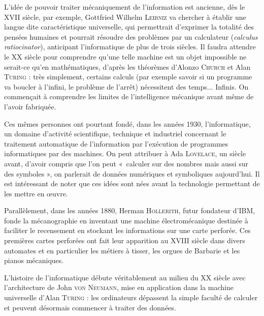 %
L'idée de pouvoir traiter mécaniquement de l'information est ancienne, dès le XVII siècle, par exemple, Gottfried Wilhelm \textsc{Leibniz} va chercher à établir une langue dite caractéristique universelle, qui permettrait d'exprimer la totalité des pensées humaines et pourrait résoudre des problèmes par un calculateur (\textit{calculus ratiocinator}), anticipant l'informatique de plus de trois siècles. Il faudra attendre le XX siècle pour comprendre qu'une telle machine est un objet impossible ne serait-ce qu'en mathématiques, d'après les théorèmes d'Alonzo \textsc{Church} et Alan \textsc{Turing} : très simplement, certains calculs (par exemple savoir si un programme va boucler à l'infini, le problème de l'arrêt) nécessitent des temps... Infinis. On commençait à comprendre les limites de l'intelligence mécanique avant même de l'avoir fabriquée.

Ces mêmes personnes ont pourtant fondé, dans les années 1930, l'informatique, un domaine d'activité scientifique, technique et industriel concernant le traitement automatique de l'information par l'exécution de programmes informatiques par des machines. On peut attribuer à Ada \textsc{Lovelace}, un siècle avant, d'avoir compris que l'on peut «~calculer sur des nombres mais aussi sur des symboles », on parlerait de données numériques et symboliques aujourd'hui. Il est intéressant de noter que ces idées sont nées avant la technologie permettant de les mettre en œuvre.

%
Parallèlement, dans les années 1880, Herman \textsc{Hollerith}, futur fondateur d'IBM, fonde la mécanographie en inventant une machine électromécanique destinée à faciliter le recensement en stockant les informations sur une carte perforée. Ces premières cartes perforées ont fait leur apparition au XVIII siècle dans divers automates et en particulier les métiers à tisser, les orgues de Barbarie et les pianos mécaniques.

L'histoire de l'informatique débute véritablement au milieu du XX siècle avec l'architecture de John \textsc{von Neumann}, mise en application dans la machine universelle d'Alan \textsc{Turing} : les ordinateurs dépassent la simple faculté de calculer et peuvent désormais commencer à traiter des données.



